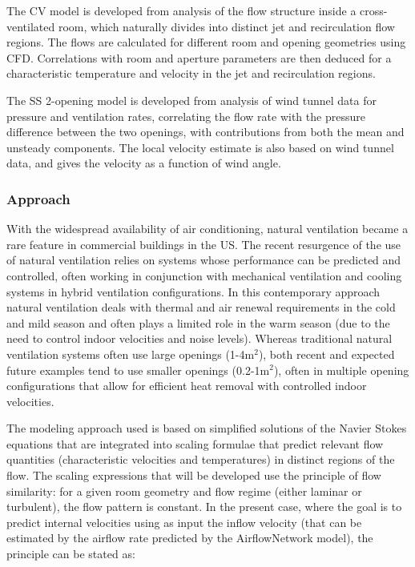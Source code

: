 The CV model is developed from analysis of the flow structure inside a cross-ventilated room, which naturally divides into distinct jet and recirculation flow regions. The flows are calculated for different room and opening geometries using CFD. Correlations with room and aperture parameters are then deduced for a characteristic temperature and velocity in the jet and recirculation regions.

The SS 2-opening model is developed from analysis of wind tunnel data for pressure and ventilation rates, correlating the flow rate with the pressure difference between the two openings, with contributions from both the mean and unsteady components. The local velocity estimate is also based on wind tunnel data, and gives the velocity as a function of wind angle.

\subsubsection{Approach}\label{approach}

With the widespread availability of air conditioning, natural ventilation became a rare feature in commercial buildings in the US. The recent resurgence of the use of natural ventilation relies on systems whose performance can be predicted and controlled, often working in conjunction with mechanical ventilation and cooling systems in hybrid ventilation configurations. In this contemporary approach natural ventilation deals with thermal and air renewal requirements in the cold and mild season and often plays a limited role in the warm season (due to the need to control indoor velocities and noise levels). Whereas traditional natural ventilation systems often use large openings (1-4m\(^{2}\)), both recent and expected future examples tend to use smaller openings (0.2-1m\(^{2}\)), often in multiple opening configurations that allow for efficient heat removal with controlled indoor velocities.

The modeling approach used is based on simplified solutions of the Navier Stokes equations that are integrated into scaling formulae that predict relevant flow quantities (characteristic velocities and temperatures) in distinct regions of the flow. The scaling expressions that will be developed use the principle of flow similarity: for a given room geometry and flow regime (either laminar or turbulent), the flow pattern is constant. In the present case, where the goal is to predict internal velocities using as input the inflow velocity (that can be estimated by the airflow rate predicted by the AirflowNetwork model), the principle can be stated as:

